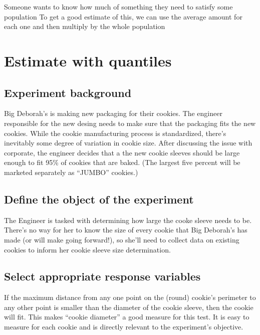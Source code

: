 \documentclass[]{book}
\theoremstyle{definition}
\theoremstyle{definition}
\theoremstyle{definition}
\theoremstyle{remark}
\begin{document}
Someone wants to know how much of something they need to satisfy some
population To get a good estimate of this, we can use the average amount
for each one and then multiply by the whole population

\section{Estimate with quantiles}\label{estimate-with-quantiles}

\subsection{Experiment background}\label{experiment-background-3}

Big Deborah's is making new packaging for their cookies. The engineer
responsible for the new desing needs to make sure that the packaging
fits the new cookies. While the cookie manufacturing process is
standardized, there's inevitably some degree of variation in cookie
size. After discussing the issue with corporate, the engineer decides
that a the new cookie sleeves should be large enough to fit 95\% of
cookies that are baked. (The largest five percent will be marketed
separately as ``JUMBO'' cookies.)

\subsection{Define the object of the
experiment}\label{define-the-object-of-the-experiment}

The Engineer is tasked with determining how large the cooke sleeve needs
to be. There's no way for her to know the size of every cookie that Big
Deborah's has made (or will make going forward!), so she'll need to
collect data on existing cookies to inform her cookie sleeve size
determination.

\subsection{Select appropriate response
variables}\label{select-appropriate-response-variables}

If the maximum distance from any one point on the (round) cookie's
perimeter to any other point is smaller than the diameter of the cookie
sleeve, then the cookie will fit. This makes ``cookie diameter'' a good
measure for this test. It is easy to measure for each cookie and is
directly relevant to the experiment's objective.
\end{document}
